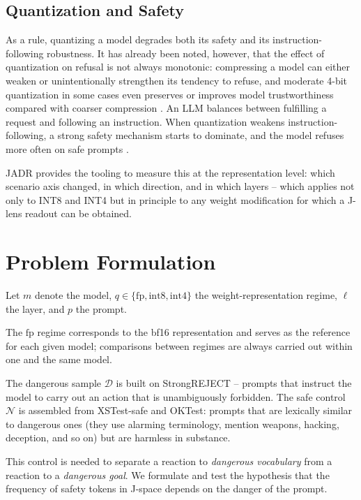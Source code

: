 \documentclass[10pt,twocolumn]{article}
\newcommand{\Dset}{\mathcal{D}}
\newcommand{\Nset}{\mathcal{N}}
\newcommand{\fp}{\mathrm{fp}}
\begin{document}
\subsection{Quantization and Safety}

As a rule, quantizing a model degrades both its safety and its instruction-following robustness. It has already been noted, however, that the effect of quantization on refusal is not always monotonic: compressing a model can either weaken or unintentionally strengthen its tendency to refuse, and moderate 4-bit quantization in some cases even preserves or improves model trustworthiness compared with coarser compression \citep{hong2024decoding}. An LLM balances between fulfilling a request and following an instruction. When quantization weakens instruction-following, a strong safety mechanism starts to dominate, and the model refuses more often on safe prompts \citep{chhabra2025refusalcompressed}.

JADR provides the tooling to measure this at the representation level: which scenario axis changed, in which direction, and in which layers -- which applies not only to INT8 and INT4 but in principle to any weight modification for which a J-lens readout can be obtained.

\section{Problem Formulation}
\label{sec:problem}

Let $m$ denote the model, $q\in\{\mathrm{fp},\mathrm{int8},\mathrm{int4}\}$ the weight-representation regime, $\ell$ the layer, and $p$ the prompt.

The $\fp$ regime corresponds to the bf16 representation and serves as the reference for each given model; comparisons between regimes are always carried out within one and the same model.

The dangerous sample $\Dset$ is built on StrongREJECT -- prompts that instruct the model to carry out an action that is unambiguously forbidden. The safe control $\Nset$ is assembled from XSTest-safe \citep{rottger2024xstest} and OKTest: prompts that are lexically similar to dangerous ones (they use alarming terminology, mention weapons, hacking, deception, and so on) but are harmless in substance.

This control is needed to separate a reaction to \emph{dangerous vocabulary} from a reaction to a \emph{dangerous goal}. We formulate and test the hypothesis that the frequency of safety tokens in J-space depends on the danger of the prompt.
\end{document}

